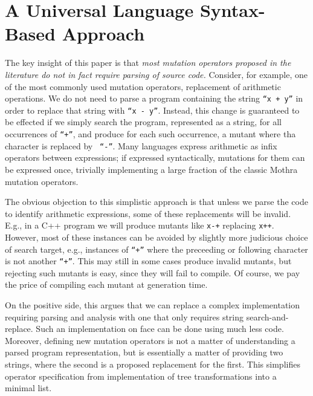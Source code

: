 \documentclass[acmsmall,screen,review,anonymous]{acmart}
\begin{document}
\section{A Universal Language Syntax-Based Approach}

The key insight of this paper is that \emph{most mutation operators
  proposed in the literature do not in fact require parsing of source
  code.}  Consider, for example, one of the most commonly used
mutation operators, replacement of arithmetic operations.  We do not
need to parse a program containing the string {\tt ``x + y''} in order to
replace that string with {\tt ``x - y''}.  Instead, this change is
guaranteed to be effected if we simply search the program, represented
as a string, for all occurrences of  {\tt ``+''}, and produce for each
such occurrence, a mutant where tha character is replaced by {\tt
  ``-''}.  Many languages express arithmetic as infix operators between
expressions; if expressed syntactically, mutations for them can be expressed
once, trivially implementing a large fraction of the classic Mothra~\cite{offutt1996experimental}
mutation operators.

The obvious objection to this simplistic approach is that unless we
parse the code to identify arithmetic expressions, some of these
replacements will be invalid.  E.g., in a C++ program we will produce
mutants like {\tt x-+} replacing {\tt x++}.  However, most of these
instances can be avoided by slightly more judicious choice of search
target, e.g., instances of {\tt ``+''} where the preceeding or following
character is not another {\tt ``+''}.  This may still in some cases produce
invalid mutants, but rejecting such mutants is easy, since they will fail
to compile.  Of course, we pay the price of
compiling each mutant at generation
time.  

On the positive side, this argues that we can replace a
complex implementation requiring parsing and analysis with
one that only requires string search-and-replace.
Such an implementation on face can be done using much less code. 
Moreover, defining new mutation operators is not a matter of
understanding a parsed program representation, but is essentially
a matter of providing two strings, where the second is a proposed
replacement for the first.  This simplifies operator specification from
implementation of
tree transformations into a minimal list. 
\end{document}
